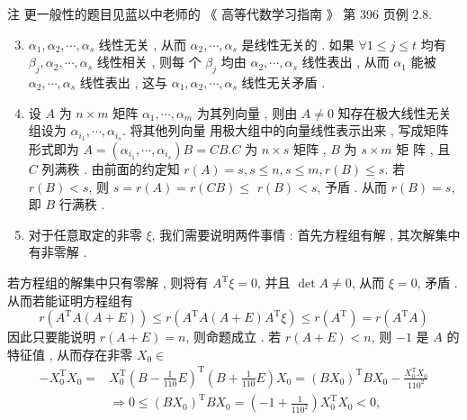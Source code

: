 \documentclass[10pt]{article}
\begin{document}
 注   更一般性的题目见蓝以中老师的 《 高等代数学习指南 》 第  396  页例  $2.8$.

\begin{enumerate}
  \setcounter{enumi}{2}
  \item $\alpha_{1}, \alpha_{2}, \cdots, \alpha_{s}$  线性无关 ,  从而  $\alpha_{2}, \cdots, \alpha_{s}$  是线性无关的 .  如果  $\forall 1 \leq j \leq t$  均有  $\beta_{j}, \alpha_{2}, \cdots, \alpha_{s}$  线性相关 ,  则每   个  $\beta_{j}$  均由  $\alpha_{2}, \cdots, \alpha_{s}$  线性表出 ,  从而  $\alpha_{1}$  能被  $\alpha_{2}, \cdots, \alpha_{s}$  线性表出 ,  这与  $\alpha_{1}, \alpha_{2}, \cdots, \alpha_{s}$  线性无关矛盾 .

  \item  设  $A$  为  $n \times m$  矩阵  $\alpha_{1}, \cdots, \alpha_{m}$  为其列向量 ,  则由  $A \neq 0$  知存在极大线性无关组设为  $\alpha_{i_{1}}, \cdots, \alpha_{i_{s}}$.  将其他列向量   用极大组中的向量线性表示出来 ,  写成矩阵形式即为  $A=\left(\alpha_{i_{1}}, \cdots, \alpha_{i_{s}}\right) B=C B . C$  为  $n \times s$  矩阵 , $B$  为  $s \times m$  矩   阵 ,  且  $C$  列满秩 .  由前面的约定知  $r(A)=s, s \leq n, s \leq m, r(B) \leq s$.  若  $r(B)<s$,  则  $s=r(A)=r(C B) \leq$ $r(B)<s$,  予盾 .  从而  $r(B)=s$,  即  $B$  行满秩 .

  \item  对于任意取定的非零  $\xi$,  我们需要说明两件事情 :  首先方程组有解 ,  其次解集中有非零解 .

\end{enumerate}
 若方程组的解集中只有零解 ,  则将有  $A^{\mathrm{T}} \xi=0$,  并且  $\operatorname{det} A \neq 0$,  从而  $\xi=0$,  矛盾 .  从而若能证明方程组有 
$$
r\left(A^{\mathrm{T}} A(A+E)\right) \leq r\left(A^{\mathrm{T}} A(A+E) A^{\mathrm{T}} \xi\right) \leq r\left(A^{\mathrm{T}}\right)=r\left(A^{\mathrm{T}} A\right)
$$
 因此只要能说明  $r(A+E)=n$,  则命题成立 .  若  $r(A+E)<n$,  则  $-1$  是  $A$  的特征值 ,  从而存在非零  $X_{0} \in$
$$
\begin{aligned}
-X_{0}^{\mathrm{T}} X_{0}=& X_{0}^{\mathrm{T}}\left(B-\frac{1}{110} E\right)^{\mathrm{T}}\left(B+\frac{1}{110} E\right) X_{0}=\left(B X_{0}\right)^{\mathrm{T}} B X_{0}-\frac{X_{0}^{\mathrm{T}} X_{0}}{110^{2}} \\
& \Longrightarrow 0 \leq\left(B X_{0}\right)^{\mathrm{T}} B X_{0}=\left(-1+\frac{1}{110^{2}}\right) X_{0}^{\mathrm{T}} X_{0}<0,
\end{aligned}
$$
\end{document}
